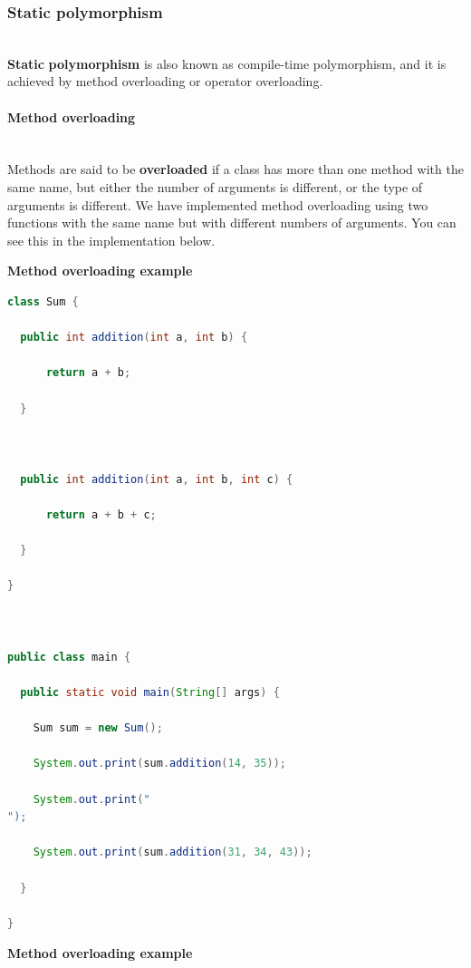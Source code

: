 \subsubsection{Static polymorphism}\label{-yDmGhFtFlxlNVvtRihGo-3}
\\
\textbf{Static} \textbf{polymorphism} is also known as compile-time polymorphism, and it is achieved by method overloading or operator overloading.
\\
\paragraph{Method overloading}\label{aamyixSY_rP2wA5BBijn9}
\\
Methods are said to be \textbf{overloaded} if a class has more than one method with the same name, but either the number of arguments is different, or the type of arguments is different. We have implemented method overloading using two functions with the same name but with different numbers of arguments. You can see this in the implementation below.

\textbf{Method overloading example}

\begin{lstlisting}[language=Java]
class Sum {

  public int addition(int a, int b) {

	  return a + b;

  }



  public int addition(int a, int b, int c) {

	  return a + b + c;

  }

}



public class main {

  public static void main(String[] args) {

    Sum sum = new Sum();

	System.out.print(sum.addition(14, 35));

	System.out.print("
");

	System.out.print(sum.addition(31, 34, 43));

  }

}
\end{lstlisting}

\textbf{Method overloading example}

